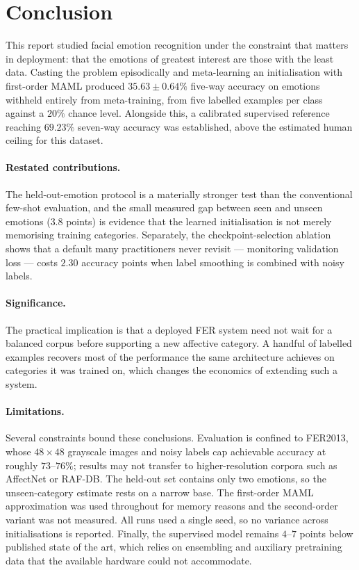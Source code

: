 \documentclass[11pt,a4paper]{article}
\begin{document}
\section{Conclusion}
\label{sec:conclusion}

This report studied facial emotion recognition under the constraint that
matters in deployment: that the emotions of greatest interest are those with
the least data. Casting the problem episodically and meta-learning an
initialisation with first-order MAML produced $35.63 \pm 0.64\%$ five-way
accuracy on emotions withheld entirely from meta-training, from five labelled
examples per class against a $20\%$ chance level. Alongside this, a calibrated
supervised reference reaching $69.23\%$ seven-way accuracy was established,
above the estimated human ceiling for this dataset.

\paragraph{Restated contributions.}
The held-out-emotion protocol is a materially stronger test than the
conventional few-shot evaluation, and the small measured gap between seen and
unseen emotions ($3.8$ points) is evidence that the learned initialisation is
not merely memorising training categories. Separately, the checkpoint-selection
ablation shows that a default many practitioners never revisit --- monitoring
validation loss --- costs $2.30$ accuracy points when label smoothing is
combined with noisy labels.

\paragraph{Significance.}
The practical implication is that a deployed FER system need not wait for a
balanced corpus before supporting a new affective category. A handful of
labelled examples recovers most of the performance the same architecture
achieves on categories it was trained on, which changes the economics of
extending such a system.

\paragraph{Limitations.}
Several constraints bound these conclusions. Evaluation is confined to FER2013,
whose $48\times48$ grayscale images and noisy labels cap achievable accuracy at
roughly $73$--$76\%$; results may not transfer to higher-resolution corpora
such as AffectNet or RAF\nobreakdash-DB. The held-out set contains only two emotions, so
the unseen-category estimate rests on a narrow base. The first-order MAML
approximation was used throughout for memory reasons and the second-order
variant was not measured. All runs used a single seed, so no variance across
initialisations is reported. Finally, the supervised model remains $4$--$7$
points below published state of the art, which relies on ensembling and
auxiliary pretraining data that the available hardware could not accommodate.
\end{document}
